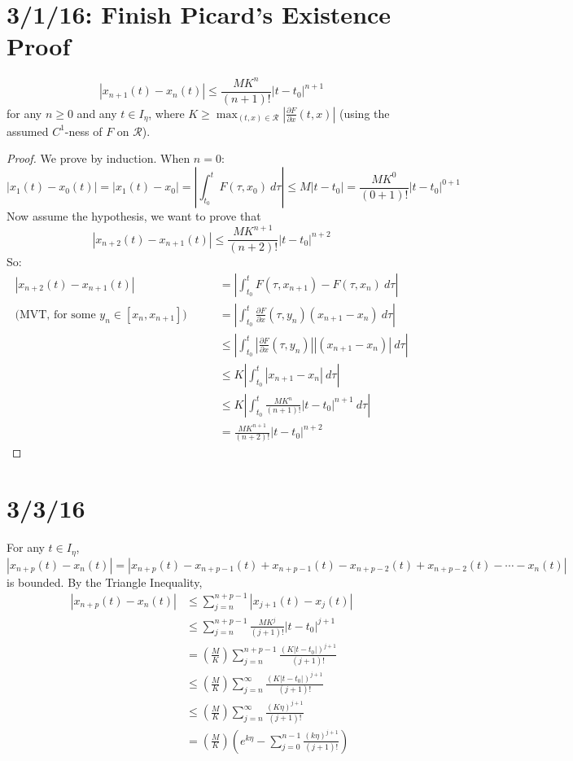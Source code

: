 \documentclass[12pt]{article}
\begin{document}
\section{3/1/16: Finish Picard's Existence Proof}

\begin{theorem}
\[ |x_{n+1}(t) - x_n(t)| \le \frac{MK^{n}}{(n+1)!}|t-t_0|^{n+1} \]
for any $n \ge 0$ and any $t \in I_{\eta}$, where $K \ge \displaystyle\max_{(t,x) \in \mathcal{R}}\left|\frac{\partial F}{\partial x}(t,x)\right|$ (using the assumed $C^1$-ness of $F$ on $\mathcal{R}$).
\end{theorem}

\begin{proof}
We prove by induction. When $n=0$:
\[ |x_1(t) - x_0(t)| = |x_1(t) - x_0| = \left|\int_{t_0}^tF(\tau,x_0) \ d\tau\right| \le M|t-t_0| = \frac{MK^0}{(0+1)!}|t-t_0|^{0+1} \]
Now assume the hypothesis, we want to prove that \[ |x_{n+2}(t) - x_{n+1}(t)| \le \frac{MK^{n+1}}{(n+2)!}|t-t_0|^{n+2} \]
So:
\[
\begin{aligned}
|x_{n+2}(t) - x_{n+1}(t)| &= \left|\int_{t_0}^tF(\tau,x_{n+1}) - F(\tau,x_n) \ d\tau \right| \\
\text{(MVT, for some } y_n \in [x_n,x_{n+1}]) \qquad &= \left|\int_{t_0}^t\frac{\partial F}{\partial x}(\tau,y_n)(x_{n+1} - x_n) \ d\tau \right| \\
&\le \left|\int_{t_0}^t\left|\frac{\partial F}{\partial x}(\tau,y_n)\right||(x_{n+1} - x_n)| \ d\tau \right|\\
&\le K\left|\int_{t_0}^t|x_{n+1} - x_n|\ d\tau \right| \\
&\le K\left|\int_{t_0}^t\frac{MK^{n}}{(n+1)!}|t-t_0|^{n+1} \ d\tau\right| \\
&= \frac{MK^{n+1}}{(n+2)!}|t-t_0|^{n+2} 
\end{aligned}
\]
\end{proof}

\section{3/3/16}

For any $t \in I_{\eta}$, \[ |x_{n+p}(t) - x_n(t)| = |x_{n+p}(t) - x_{n+p-1}(t) + x_{n+p-1}(t) - x_{n+p-2}(t) + x_{n+p-2}(t) - \cdots - x_n(t)| \] is bounded. By the Triangle Inequality,
\[
\begin{aligned}
|x_{n+p}(t) - x_n(t)| &\le \sum_{j=n}^{n+p-1}|x_{j+1}(t) - x_j(t)| \\
&\le \sum_{j=n}^{n+p-1} \frac{MK^j}{(j+1)!}|t-t_0|^{j+1} \\
&= \left(\frac{M}{K}\right) \sum_{j=n}^{n+p-1}\frac{(K|t-t_0|)^{j+1}}{(j+1)!} \\
&\le \left(\frac{M}{K}\right) \sum_{j=n}^{\infty}\frac{(K|t-t_0|)^{j+1}}{(j+1)!}\\
&\le \left(\frac{M}{K}\right) \sum_{j=n}^{\infty}\frac{(K\eta)^{j+1}}{(j+1)!}\\
&= \left(\frac{M}{K}\right)\left(e^{k\eta} - \sum_{j=0}^{n-1}\frac{(k\eta)^{j+1}}{(j+1)!} \right)
\end{aligned}
\]
\end{document}
